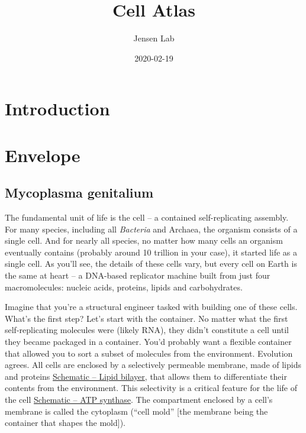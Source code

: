 \documentclass[]{tufte-book}
\title{Cell Atlas}
\author{Jensen Lab}
\date{2020-02-19}
\begin{document}
\maketitle



{
\setcounter{tocdepth}{1}
\tableofcontents
}

\chapter{Introduction}\label{introduction}

\chapter{Envelope}\label{envelope}

\section{Mycoplasma genitalium}\label{mycoplasma-genitalium}

The fundamental unit of life is the cell -- a contained self-replicating
assembly. For many species, including all \emph{Bacteria} and Archaea,
the organism consists of a single cell. And for nearly all species, no
matter how many cells an organism eventually contains (probably around
10 trillion in your case), it started life as a single cell. As you'll
see, the details of these cells vary, but every cell on Earth is the
same at heart -- a DNA-based replicator machine built from just four
macromolecules: nucleic acids, proteins, lipids and carbohydrates.

Imagine that you're a structural engineer tasked with building one of
these cells. What's the first step? Let's start with the container. No
matter what the first self-replicating molecules were (likely RNA), they
didn't constitute a cell until they became packaged in a container.
You'd probably want a flexible container that allowed you to sort a
subset of molecules from the environment. Evolution agrees. All cells
are enclosed by a selectively permeable membrane, made of lipids and
proteins \protect\hyperlink{fig:2-1-1}{Schematic -- Lipid bilayer}, that
allows them to differentiate their contents from the environment. This
selectivity is a critical feature for the life of the cell
\protect\hyperlink{fig:2-1-2}{Schematic -- ATP synthase}. The
compartment enclosed by a cell's membrane is called the cytoplasm
(``cell mold'' {[}the membrane being the container that shapes the
mold{]}).
\end{document}
